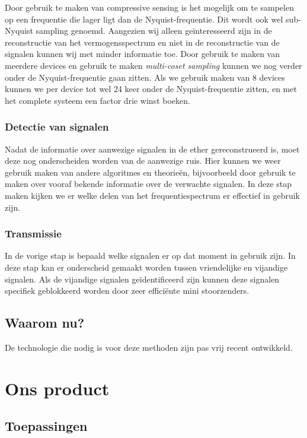 \documentclass[oneside, a4paper, openany]{memoir}
\begin{document}
\begin{blockDetail}
Door gebruik te maken van compressive sensing is het mogelijk om te sampelen op een frequentie die lager ligt dan de Nyquist-frequentie. Dit wordt ook wel sub-Nyquist sampling genoemd. Aangezien wij alleen geïnteresseerd zijn in de reconstructie van het vermogensspectrum en niet in de reconstructie van de signalen kunnen wij met minder informatie toe. Door gebruik te maken van meerdere devices en gebruik te maken \textit{multi-coset sampling} kunnen we nog verder onder de Nyquist-frequentie gaan zitten. Als we gebruik maken van 8 devices kunnen we per device tot wel 24 keer onder de Nyquist-frequentie zitten, en met het complete systeem een factor drie winst boeken.\cite{ariananda2011multicoset}\cite{ariananda2012compressive}
\end{blockDetail}

\subsection{Detectie van signalen}
Nadat de informatie over aanwezige signalen in de ether gereconstrueerd is, moet deze nog onderscheiden worden van de aanwezige ruis. Hier kunnen we weer gebruik maken van andere algoritmes en theorieën, bijvoorbeeld door gebruik te maken over vooraf bekende informatie over de verwachte signalen. In deze stap maken kijken we er welke delen van het frequentiespectrum er effectief in gebruik zijn.

\subsection{Transmissie}
In de vorige stap is bepaald welke signalen er op dat moment in gebruik zijn. In deze stap kan er onderscheid gemaakt worden tussen vriendelijke en vijandige signalen. Als de vijandige signalen geïdentificeerd zijn kunnen deze signalen specifiek geblokkeerd worden door zeer efficiënte mini stoorzenders.

\section{Waarom nu?}
De technologie die nodig is voor deze methoden zijn pas vrij recent ontwikkeld.


\chapter{Ons product}
\section{Toepassingen}
\end{document}
